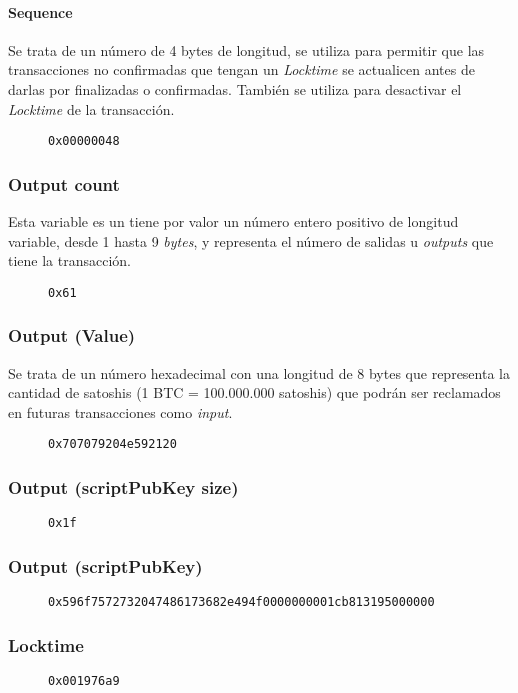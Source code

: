 \documentclass{article}
\begin{document}
    \paragraph{Sequence}
    Se trata de un número de 4 bytes de longitud, se utiliza para permitir que las transacciones no confirmadas que tengan un \textit{Locktime} se actualicen antes de darlas por finalizadas o confirmadas. También se utiliza para desactivar el \textit{Locktime} de la transacción.
    \begin{figure}[H]
        \texttt{0x00000048}
    \end{figure}
    
    \subsubsection{Output count}
    Esta variable es un tiene por valor un número entero positivo de longitud variable, desde 1 hasta 9 \textit{bytes}, y representa el número de salidas u \textit{outputs} que tiene la transacción.
    \begin{figure}[H]
        \texttt{0x61}
    \end{figure}
    
    \subsubsection{Output (Value)}
    Se trata de un número hexadecimal con una longitud de 8 bytes que representa la cantidad de satoshis (1 BTC = 100.000.000 satoshis) que podrán ser reclamados en futuras transacciones como \textit{input}.
    \begin{figure}[H]
        \texttt{0x707079204e592120}
    \end{figure}
    
    \subsubsection{Output (scriptPubKey size)}
    \begin{figure}[H]
        \texttt{0x1f}
    \end{figure}
    
    \subsubsection{Output (scriptPubKey)}
    \begin{figure}[H]
        \texttt{0x596f7572732047486173682e494f0000000001cb813195000000}
    \end{figure}
    
    \subsubsection{Locktime}
    \begin{figure}[H]
        \texttt{0x001976a9}
    \end{figure}
    
\end{document}
